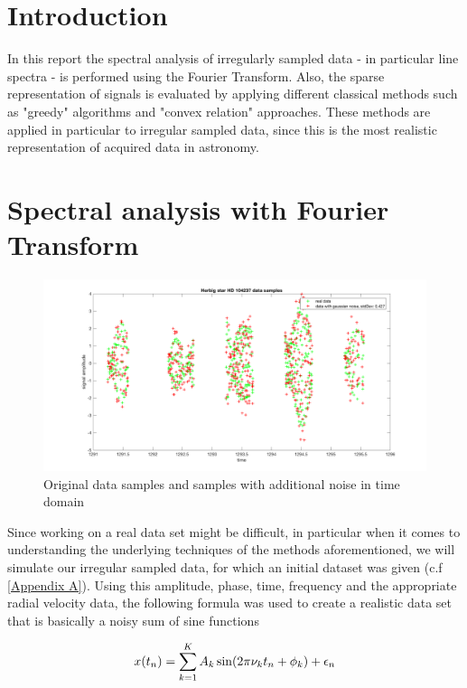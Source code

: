 
\section{Introduction}
In this report the spectral analysis of irregularly sampled data - in particular line spectra - is performed using the Fourier Transform. Also, the sparse representation of signals is evaluated by applying different classical methods such as "greedy" algorithms and "convex relation" approaches. These methods are applied in particular to irregular sampled data, since this is the most realistic representation of acquired data in astronomy.


\section{Spectral analysis with Fourier Transform}
\begin{figure}[h!]
	\centering
	\includegraphics[width=\textwidth]{images/data}
	\caption{Original data samples and samples with additional noise in time domain}
	\label{fig:data}
\end{figure}
Since working on a real data set might be difficult, in particular when it comes to understanding the underlying techniques of the methods aforementioned, we will simulate our irregular sampled data, for which an initial dataset was given (c.f \cref{Appendix A}).
Using this amplitude, phase, time, frequency and the appropriate radial velocity data, the following formula was used to create a realistic data set that is basically a noisy sum of sine functions

\begin{equation}
	\centering
	x(t_n) = \sum_{k=1}^K A_k \sin(2\pi\nu_kt_n + \phi_k) + \epsilon_n
	\label{eq:sinesum}
\end{equation}

